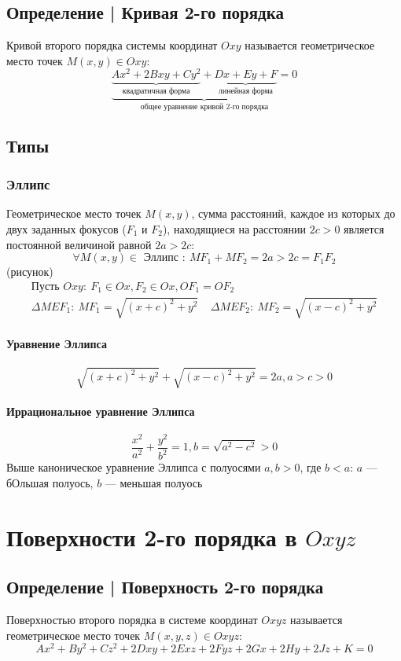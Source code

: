 \documentclass{article}
\begin{document}
\subsection{Определение | Кривая 2-го порядка}
Кривой второго порядка системы координат $Oxy$ называется геометрическое место точек $M(x, y) \in Oxy$:
\[
    \underbrace{\underbrace{Ax^2 + 2Bxy + Cy^2}_{\text{квадратичная форма}} + \underbrace{Dx + Ey + F}_{\text{линейная форма}} = 0}_{\text{общее уравнение кривой 2-го порядка}}
\]


\subsection{Типы}
\subsubsection{Эллипс}
Геометрическое место точек $M(x, y)$, сумма расстояний, каждое из которых до двух заданных фокусов ($F_1$ и $F_2$),
находящиеся на расстоянии $2c > 0$ является постоянной величиной равной $2a > 2c$:
\[
    \forall M(x, y) \in \text{ Эллипс }:~ MF_1 + MF_2 = 2a > 2c = F_1F_2
\]
(рисунок)
\begin{gather*}
    \text{Пусть } Oxy:~ F_1 \in Ox, F_2 \in Ox, OF_1 = OF_2 \\
    \Delta MEF_1:~ MF_1 = \sqrt{(x + c)^2 + y^2} ~~~~~
    \Delta MEF_2:~ MF_2 = \sqrt{(x - c)^2 + y^2}
\end{gather*}
\paragraph{Уравнение Эллипса} 
\[
    \sqrt{(x + c)^2 + y^2} + \sqrt{(x - c)^2 + y^2} = 2a, a > c > 0
\]
\paragraph{Иррациональное уравнение Эллипса}
\[
    \frac{x^2}{a^2} + \frac{y^2}{b^2} = 1, b = \sqrt{a^2 - c^2} > 0
\]
Выше каноническое уравнение Эллипса с полуосями $a, b > 0$, где
$b < a$: $a$ --- бОльшая полуось, $b$ --- меньшая полуось



\section{Поверхности 2-го порядка в $Oxyz$}
\subsection{Определение | Поверхность 2-го порядка}
Поверхностью второго порядка в системе координат $Oxyz$ называется \\ 
геометрическое место точек $M(x, y, z) \in Oxyz$:
\[
    Ax^2 + By^2 + Cz^2 + 2Dxy + 2Exz + 2Fyz + 2Gx + 2Hy + 2Jz + K = 0
\]
 
\end{document}
